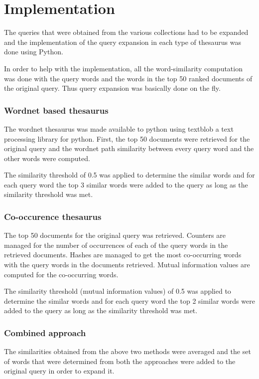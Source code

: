 \documentclass[a4paper, 12pt, notitlepage]{report}
\begin{document}
\chapter{Implementation}
The queries that were obtained from the various collections had to be expanded and the implementation of the query expansion in each type of thesaurus was done using Python.

In order to help with the implementation, all the word-similarity computation was done with the query words and the words in the top 50 ranked documents of the original query. Thus query expansion was basically done on the fly. 

\subsection*{Wordnet based thesaurus}
The wordnet thesaurus was made available to python using textblob \cite{textblob} a text processing library for python. First, the top 50 documents were retrieved for the original query and the wordnet path similarity between every query word and the other words were computed. 

The similarity threshold of 0.5 was applied to determine the similar words and for each query word the top 3 similar words were added to the query as long as the similarity threshold was met.
 
\subsection*{Co-occurence thesaurus}
The top 50 documents for the original query was retrieved. Counters are managed for the number of occurrences of each of the query words in the retrieved documents. Hashes are managed to get the most co-occurring words with the query words in the documents retrieved. Mutual information values are computed for the co-occurring words.

The similarity threshold (mutual information values) of 0.5 was applied to determine the similar words and for each query word the top 2 similar words were added to the query as long as the similarity threshold was met.  

\subsection*{Combined approach}
The similarities obtained from the above two methods were averaged and the set of words that were determined from both the approaches were added to the original query in order to expand it.
\end{document}
